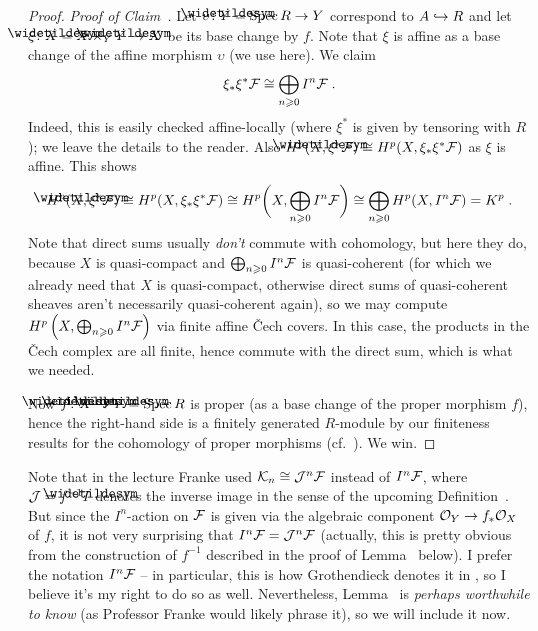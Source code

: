 \documentclass[a4paper,parskip=half,numbers=enddot, DIV=12]{scrreprt}
\renewcommand{\geq}{\geqslant}
\begin{document}
\begin{proof}
	\emph{Proof of Claim~.} Let $\upsilon\colon\snake{Y}=\Spec R\morphism Y$ correspond to $A\monomorphism R$ and let $\xi\colon \snake{X}=X\times_Y\snake{Y}\morphism X$ be its base change by $f$. Note that $\xi$ is affine as a base change of the affine morphism $\upsilon$ (we use \cite[Corollary~2.5.1]{alggeo1} here). We claim
	\begin{align*}
		\xi_*\xi^*\Ff\cong\bigoplus_{n\geq 0}I^n\Ff\;.
	\end{align*}
	Indeed, this is easily checked affine-locally (where $\xi^*$ is given by tensoring with $R$); we leave the details to the reader. Also $H^p(\snake{X},\xi^*\Ff)\cong H^p(X,\xi_*\xi^*\Ff)$ as $\xi$ is affine. This shows
	\begin{align*}
		H^p(\snake{X},\xi^*\Ff)\cong H^p(X,\xi_*\xi^*\Ff)\cong H^p\bigg(X,\bigoplus_{n\geq 0}I^n\Ff\bigg)\cong \bigoplus_{n\geq 0}H^p(X,I^n\Ff)=K^p\;.
	\end{align*}
	Note that direct sums usually \emph{don't} commute with cohomology, but here they do, because $X$ is quasi-compact and $\bigoplus_{n\geq 0}I^n\Ff$ is quasi-coherent (for which we already need that $X$ is quasi-compact, otherwise direct sums of quasi-coherent sheaves aren't necessarily quasi-coherent again), so we may compute $H^p\left(X,\bigoplus_{n\geq 0}I^n\Ff\right)$ via finite affine \v Cech covers. In this case, the products in the \v Cech complex are all finite, hence commute with the direct sum, which is what we needed.
	
	Now $\snake{f}\colon \snake{X}\morphism\snake{Y}=\Spec R$ is proper (as a base change of the proper morphism $f$), hence the right-hand side is a finitely generated $R$-module by our finiteness results for the cohomology of proper morphisms (cf.\ \cite[Theorem~5]{alggeo2}). We win.
\end{proof}
\begin{rem}
	Note that in the lecture Franke used $\mathcal{K}_n\cong \mathcal{J}^n\mathcal{F}$ instead of $I^n\mathcal{F}$, where $\Jj=f^{-1}\snake I$ denotes the inverse image in the sense of the upcoming Definition~. But since the $I^n$-action on $\mathcal{F}$ is given via the algebraic component $\Oo_Y\morphism f_*\Oo_X$ of $f$, it is not very surprising that $I^n\mathcal{F}= \mathcal{J}^n\mathcal{F}$ (actually, this is pretty obvious from the construction of $f^{-1}$ described in the proof of Lemma~ below). I prefer the notation $I^n\mathcal{F}$ -- in particular, this is how Grothendieck denotes it in \cite[Ch.\:III (4.1.7)]{egaIII}, so I believe it's my right to do so as well. Nevertheless, Lemma~ is \emph{perhaps worthwhile to know} (as Professor Franke would likely phrase it), so we will include it now.
\end{rem}
\end{document}
